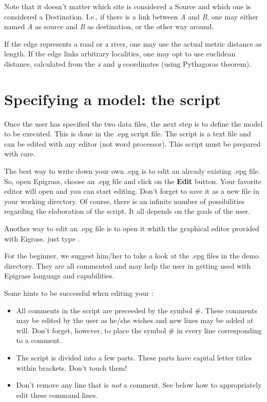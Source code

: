 \documentclass[a4paper,10pt]{manual}
\begin{document}
Note that it doesn't matter which site is considered a Source and which one is considered a Destination. I.e., if there is a link between \emph{A} and \emph{B}, one may either named \emph{A} as source and \emph{B} as destination, or the other way around.

If the edge represents a road or a river, one may use the actual metric distance as length. If the edge links arbitrary localities, one may opt to use euclidean distance, calculated from the \emph{x} and \emph{y} coordinates (using Pythagoras theorem).


\section{Specifying a model: the script}

Once the user has specified the two data files, the next step is to define the model to be executed. This is done in the .epg script file. The    script is a text file and can be edited with any editor (not word processor). This script must be prepared with care.

The best way to write down your own .epg is to edit an already existing .epg file. So, open Epigrass, choose an .epg file and click on the \textbf{Edit} button. Your favorite editor will open and you can start editing. Don't forget to save it as a new file in your working directory. Of course, there is an infinite number of possibilities regarding the elaboration of the script. It all depends on the goals of the user.

\begin{notice}[note]
Another way to edit an .epg file is to open it whith the graphical editor provided with Eigrass. just type .
\end{notice}

For the beginner, we suggest him/her to take a look at the .epg files in the demo directory. They are all commented and may help the user in getting used with Epigrass language and capabilities.

Some hints to be successful when editing your   :
\begin{itemize}
\item {} 
All comments in the script are preceeded by the symbol \#. These comments may be edited by the user as he/she wishes and new lines may be added at will. Don't forget, however, to place the symbol \# in every line corresponding to a comment.

\item {} 
The script is divided into a few parts. These parts have capital letter titles within brackets. Don't touch them!

\item {} 
Don't remove any line that is \emph{not} a comment. See below how to appropriately edit these command lines.

\end{itemize}
\end{document}
